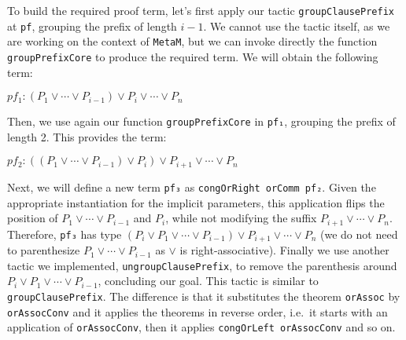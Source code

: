 To build the required proof term, let's first apply our tactic \texttt{groupClausePrefix} at \texttt{pf}, grouping the prefix of length $i - 1$.
We cannot use the tactic itself, as we are working on the context of \texttt{MetaM}, but we can invoke directly the function \texttt{groupPrefixCore}
to produce the required term. We will obtain the following term:

\begin{center}
  $pf_{1} : (P_{1} \vee \cdots \vee P_{i - 1}) \vee P_{i} \vee \cdots \vee P_{n}$
\end{center}

Then, we use again our function \texttt{groupPrefixCore} in \texttt{pf₁}, grouping the prefix of length 2. This provides the term:

\begin{center}
  $pf_{2} : ((P_{1} \vee \cdots \vee P_{i - 1}) \vee P_{i}) \vee P_{i + 1} \vee \cdots \vee P_{n}$
\end{center}

Next, we will define a new term \texttt{pf₃} as \texttt{congOrRight orComm pf₂}. Given the appropriate instantiation for the implicit parameters,
this application flips the position of $P_{1} \vee \cdots \vee P_{i - 1}$ and $P_{i}$, while not modifying the suffix $P_{i + 1} \vee \cdots \vee P_{n}$.
Therefore, \texttt{pf₃} has type $(P_{i} \vee P_{1} \vee \cdots \vee P_{i - 1}) \vee P_{i + 1} \vee \cdots \vee P_{n}$ (we do not need to parenthesize
$P_{1} \vee \cdots \vee P_{i - 1}$ as $\vee$ is right-associative). Finally we use another tactic we implemented, \texttt{ungroupClausePrefix},
to remove the parenthesis around $P_{i} \vee P_{1} \vee \cdots \vee P_{i - 1}$, concluding our goal.
This tactic is similar to \texttt{groupClausePrefix}. The
difference is that it substitutes the theorem \texttt{orAssoc} by \texttt{orAssocConv} and it applies the theorems in reverse order, i.e.\ it
starts with an application of \texttt{orAssocConv}, then it applies \texttt{congOrLeft orAssocConv} and so on.

